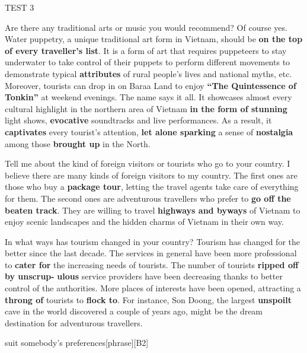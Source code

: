 \documentclass[a4paper,12pt]{article}
\begin{document}
\begin{glossarymc}[Cambridge 3]
\begin{test}{TEST 3}
\begin{qa}{Are there any traditional arts or music you would recommend?}
Of course yes. Water puppetry, a unique traditional art form in Vietnam, should be \textbf{on the top of every traveller's list}. It is a form of art that requires puppeteers to stay underwater to take control of their puppets to perform different movements to demonstrate typical \textbf{attributes} of rural people's lives and national myths, etc. Moreover, tourists can drop in on Baraa Land to enjoy \textbf{“The Quintessence of Tonkin”} at weekend evenings. The name says it all. It showcases almost every cultural highlight in the northern area of Vietnam \textbf{in the form of stunning} light shows, \textbf{evocative} soundtracks and live performances. As a result, it \textbf{captivates} every tourist's attention, \textbf{let alone sparking} a sense of \textbf{nostalgia} among those \textbf{brought up} in the North.
\end{qa}

\begin{qa}{Tell me about the kind of foreign visitors or tourists who go to your country.}
I believe there are many kinds of foreign visitors to my country. The first ones are those who buy a \textbf{package tour}, letting the travel agents take care of everything for them. The second ones are adventurous travellers who prefer to \textbf{go off the beaten track}. They are willing to travel \textbf{highways and byways} of Vietnam to enjoy scenic landscapes and the hidden charms of Vietnam in their own way.
\end{qa}

\begin{qa}{In what ways has tourism changed in your country?}
Tourism has changed for the better since the last decade. The services in general have been more professional to \textbf{cater for} the increasing needs of tourists. The number of tourists \textbf{ripped off by unscrup-}
\textbf{ulous} service providers have been decreasing thanks to better control of the authorities. More places of interests have been opened, attracting a \textbf{throng of} tourists to \textbf{flock to}. For instance, Son Doong, the largest \textbf{unspoilt} cave in the world discovered a couple of years ago, might be the dream destination for adventurous travellers.
\end{qa}


\begin{VocabExplain}[Part 1]
    \begin{ExplainCard}{suit somebody's preferences}[phrase][B2]
\end{ExplainCard}


\end{VocabExplain}
\end{test}
\end{glossarymc}
\end{document}
